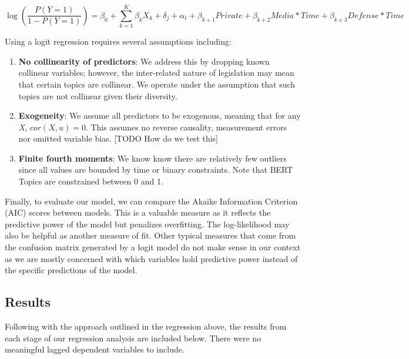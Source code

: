 \documentclass{article}
\begin{document}
\begin{equation}
\log\left( \frac{P(Y=1)}{1 - P(Y=1)} \right) = \beta_0 + \sum_{k=1}^{K} \beta_k X_k + \delta_j + \alpha_t + \beta_{k+1}Private + \beta_{k+2}Media*Time + \beta_{k+3}Defense*Time
\end{equation}

Using a logit regression requires several assumptions including:
\\
\begin{adjustwidth}{2em}{0em}
\begin{enumerate}
    \item \textbf{No collinearity of predictors}: We address this by dropping known collinear variables; however, the inter-related nature of legislation may mean that certain topics are collinear. We operate under the assumption that such topics are not collinear given their diversity. 
    \item \textbf{Exogeneity}: We assume all predictors to be exogenous, meaning that for any \textit{X}, $cor(X,u) = 0$. This assumes no reverse causality, measurement errors nor omitted variable bias. [TODO How do we test this]
    \item \textbf{Finite fourth moments}: We know know there are relatively few outliers since all values are bounded by time or binary constraints. Note that BERT Topics are constrained between 0 and 1. 
\end{enumerate}
\end{adjustwidth}

Finally, to evaluate our model, we can compare the Akaike Information Criterion (AIC) scores between models. This is a valuable measure as it reflects the predictive power of the model but penalizes overfitting. The log-likelihood may also be helpful as another measure of fit. Other typical measures that come from the confusion matrix generated by a logit model do not make sense in our context as we are mostly concerned with which variables hold predictive power instead of the specific predictions of the model. 


\subsection{Results}

Following with the approach outlined in the regression above, the results from each stage of our regression analysis are included below. There were no meaningful lagged dependent variables to include.
\end{document}

